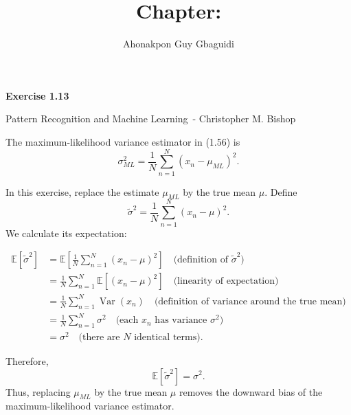 \documentclass{article}
\title{Chapter: \ChapterName}
\author{Ahonakpon Guy Gbaguidi}
\date{}
\newcommand{\BookName}{Pattern Recognition and Machine Learning}
\newcommand{\BookAuthor}{Christopher M. Bishop}
\newcommand{\ExerciseID}{1.13}
\begin{document}
\maketitle

\begin{center}
  \large\textbf{Exercise \ExerciseID}

  \vspace{0.5em}

  \normalsize\BookName\ - \BookAuthor
\end{center}

\begin{tcolorbox}[breakable,colback=gray!5,colframe=gray!60,title=Solution]
The maximum-likelihood variance estimator in (1.56) is
\[
\sigma^2_{ML} = \frac{1}{N} \sum_{n=1}^{N} (x_n - \mu_{ML})^2.
\]

In this exercise, replace the estimate $\mu_{ML}$ by the true mean $\mu$. Define
\[
\widetilde{\sigma}^2 = \frac{1}{N} \sum_{n=1}^{N} (x_n - \mu)^2.
\]
We calculate its expectation:

\begin{align*}
\mathbb{E}[\widetilde{\sigma}^2]
&= \mathbb{E}\left[\frac{1}{N} \sum_{n=1}^{N} (x_n - \mu)^2\right]
  \quad \text{(definition of $\widetilde{\sigma}^2$)} \\
&= \frac{1}{N} \sum_{n=1}^{N} \mathbb{E}\left[(x_n - \mu)^2\right]
  \quad \text{(linearity of expectation)} \\
&= \frac{1}{N} \sum_{n=1}^{N} \operatorname{Var}(x_n)
  \quad \text{(definition of variance around the true mean)} \\
&= \frac{1}{N} \sum_{n=1}^{N} \sigma^2
  \quad \text{(each $x_n$ has variance $\sigma^2$)} \\
&= \sigma^2
  \quad \text{(there are $N$ identical terms).}
\end{align*}

Therefore,
\[
\boxed{\mathbb{E}[\widetilde{\sigma}^2] = \sigma^2}.
\]
Thus, replacing $\mu_{ML}$ by the true mean $\mu$ removes the downward bias of the maximum-likelihood variance estimator.
\end{tcolorbox}
\end{document}
